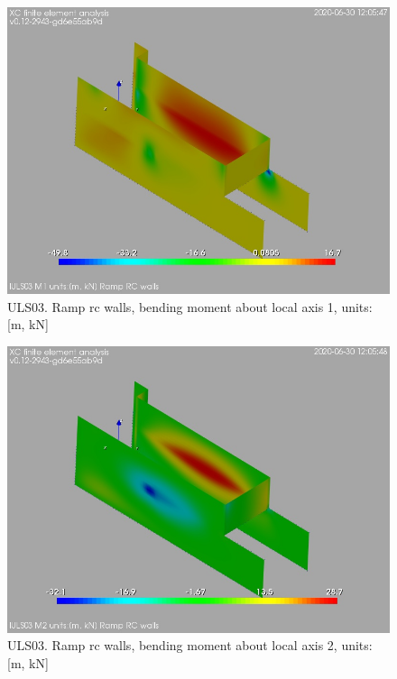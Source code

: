 \begin{figure}
\begin{center}
\includegraphics[width=\linewidth]{ramp_wall/resLC/text/graphics/resSimplLC/lULS03wallsM1}
\caption{ULS03. Ramp rc walls, bending moment about local axis 1, units:[m, kN]}
\end{center}
\end{figure}
\begin{figure}
\begin{center}
\includegraphics[width=\linewidth]{ramp_wall/resLC/text/graphics/resSimplLC/lULS03wallsM2}
\caption{ULS03. Ramp rc walls, bending moment about local axis 2, units:[m, kN]}
\end{center}
\end{figure}
